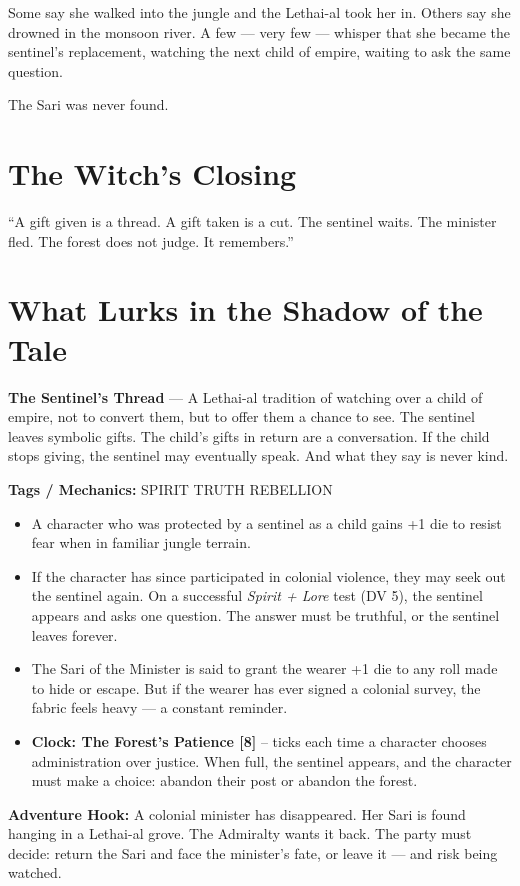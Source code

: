 \documentclass[10pt,twoside]{book}
\newcommand{\tag}[1]{\textsc{#1}}
\begin{document}
Some say she walked into the jungle and the Lethai-al took her in. Others say she drowned in the monsoon river. A few --- very few --- whisper that she became the sentinel's replacement, watching the next child of empire, waiting to ask the same question.

The Sari was never found.

\section*{The Witch's Closing}
``A gift given is a thread. A gift taken is a cut. The sentinel waits. The minister fled. The forest does not judge. It remembers.''

\section*{What Lurks in the Shadow of the Tale}
\begin{infobox}
\textbf{The Sentinel's Thread} --- A Lethai-al tradition of watching over a child of empire, not to convert them, but to offer them a chance to see. The sentinel leaves symbolic gifts. The child's gifts in return are a conversation. If the child stops giving, the sentinel may eventually speak. And what they say is never kind.

\textbf{Tags / Mechanics:} \tag{SPIRIT} \tag{TRUTH} \tag{REBELLION}

\begin{itemize}
\item A character who was protected by a sentinel as a child gains +1 die to resist fear when in familiar jungle terrain.
\item If the character has since participated in colonial violence, they may seek out the sentinel again. On a successful \textit{Spirit + Lore} test (DV 5), the sentinel appears and asks one question. The answer must be truthful, or the sentinel leaves forever.
\item The Sari of the Minister is said to grant the wearer +1 die to any roll made to hide or escape. But if the wearer has ever signed a colonial survey, the fabric feels heavy --- a constant reminder.
\item \textbf{Clock: The Forest's Patience [8]} -- ticks each time a character chooses administration over justice. When full, the sentinel appears, and the character must make a choice: abandon their post or abandon the forest.
\end{itemize}

\textbf{Adventure Hook:} A colonial minister has disappeared. Her Sari is found hanging in a Lethai-al grove. The Admiralty wants it back. The party must decide: return the Sari and face the minister's fate, or leave it --- and risk being watched.
\end{infobox}
\end{document}
